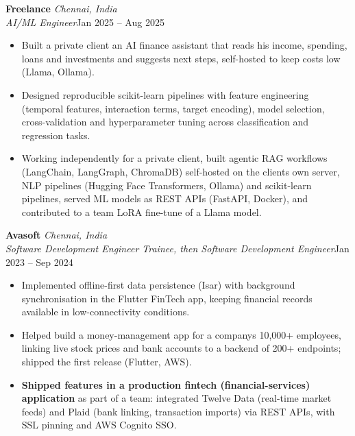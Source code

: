 \documentclass[a4paper,11pt]{article}
\newcommand{\role}[4]{%
  \textbf{#1}{\color{muted}\,\textperiodcentered\,\textit{#2}}\\
  \textit{#4}\hfill{\color{muted}#3}\par}
\newcommand{\gap}{\vspace{5pt}}
\newcommand{\num}[1]{\textbf{#1}}   %
\begin{document}
\gap
{}
\role{Freelance}{Chennai, India}{Jan 2025 – Aug 2025}{AI/ML Engineer}
\begin{itemize}
  \item Built a private client an AI finance assistant that reads his income, spending, loans and investments and suggests next steps, self-hosted to keep costs low (Llama, Ollama).
  \item Designed reproducible scikit-learn pipelines with feature engineering (temporal features, interaction terms, target encoding), model selection, cross-validation and hyperparameter tuning across classification and regression tasks.
  \item Working independently for a private client, built agentic RAG workflows (LangChain, LangGraph, ChromaDB) self-hosted on the client\textquotesingle{}s own server, NLP pipelines (Hugging Face Transformers, Ollama) and scikit-learn pipelines, served ML models as REST APIs (FastAPI, Docker), and contributed to a team LoRA fine-tune of a Llama model.
\end{itemize}
\gap
{}
\role{Avasoft}{Chennai, India}{Jan 2023 – Sep 2024}{Software Development Engineer Trainee, then Software Development Engineer}
\begin{itemize}
  \item Implemented offline-first data persistence (Isar) with background synchronisation in the Flutter FinTech app, keeping financial records available in low-connectivity conditions.
  \item Helped build a money-management app for a company\textquotesingle{}s 10,000+ employees, linking live stock prices and bank accounts to a backend of 200+ endpoints; shipped the first release (Flutter, AWS).
  \item \num{Shipped features in a production fintech (financial-services) application} as part of a team: integrated Twelve Data (real-time market feeds) and Plaid (bank linking, transaction imports) via REST APIs, with SSL pinning and AWS Cognito SSO.
\end{itemize}
\end{document}
